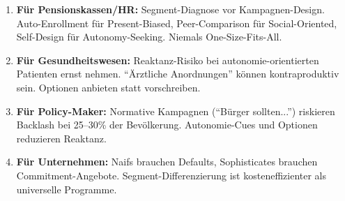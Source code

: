 \begin{enumerate}
\item \textbf{Für Pensionskassen/HR:} Segment-Diagnose vor Kampagnen-Design. Auto-Enrollment für Present-Biased, Peer-Comparison für Social-Oriented, Self-Design für Autonomy-Seeking. Niemals One-Size-Fits-All.

\item \textbf{Für Gesundheitswesen:} Reaktanz-Risiko bei autonomie-orientierten Patienten ernst nehmen. ``Ärztliche Anordnungen'' können kontraproduktiv sein. Optionen anbieten statt vorschreiben.

\item \textbf{Für Policy-Maker:} Normative Kampagnen (``Bürger sollten...'') riskieren Backlash bei 25--30\% der Bevölkerung. Autonomie-Cues und Optionen reduzieren Reaktanz.

\item \textbf{Für Unternehmen:} Naifs brauchen Defaults, Sophisticates brauchen Commitment-Angebote. Segment-Differenzierung ist kosteneffizienter als universelle Programme.
\end{enumerate}


